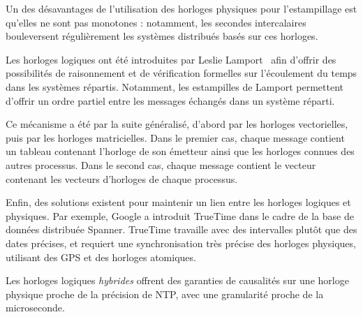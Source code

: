 \documentclass{article}
\begin{document}
Un des désavantages de l'utilisation des horloges physiques pour l'estampillage est qu'elles ne sont pas monotones : notamment, les secondes intercalaires bouleversent régulièrement les systèmes distribués basés sur ces horloges.

Les horloges logiques ont été introduites par Leslie Lamport~\cite{lamport1978time} afin d'offrir des possibilités de raisonnement et de vérification formelles sur l'écoulement du temps dans les systèmes répartis.
Notamment, les estampilles de Lamport permettent d'offrir un ordre partiel entre les messages échangés dans un système réparti.

Ce mécanisme a été par la suite généralisé, d'abord par les horloges vectorielles, puis par les horloges matricielles. 
Dans le premier cas, chaque message contient un tableau contenant l'horloge de son émetteur ainsi que les horloges connues des autres processus. Dans le second cas, chaque message contient le vecteur contenant les vecteurs d'horloges de chaque processus.

Enfin, des solutions existent pour maintenir un lien entre les horloges logiques et physiques. 
Par exemple, Google a introduit TrueTime dans le cadre de la base de données distribuée Spanner\cite{corbett2013spanner}. 
TrueTime travaille avec des intervalles plutôt que des dates précises, et requiert une synchronisation très précise des horloges physiques, utilisant des GPS et des horloges atomiques.

Les horloges logiques \emph{hybrides}\cite{kulkarni2014logical} offrent des garanties de causalités sur une horloge physique proche de la précision de NTP, avec une granularité proche de la microseconde.


\end{document}
